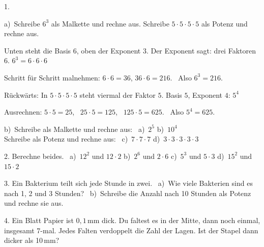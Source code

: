 \documentclass[11pt]{article}
\newcommand{\kennung}{VUD}
\newcommand{\grau}[1]{{\color{mbgrau}#1}}
\begin{document}
\pfheftstil
\fancyfoot[C]{\parbox[t]{\textwidth}{\mbfhbox\par\vspace{1.5mm}{\footnotesize\color{mbgrau}{\scriptsize \kennung}\hfill\thepage}}}
\begin{pfaufg}{}{1.}{}
\grau{a)\ Schreibe $6^3$ als Malkette und rechne aus. Schreibe $5 \cdot 5 \cdot 5 \cdot 5$ als Potenz und rechne aus.\par\smallskip Unten steht die Basis $6$, oben der Exponent $3$. Der Exponent sagt: drei Faktoren $6$. \quad $6^3 = 6 \cdot 6 \cdot 6$\par Schritt für Schritt malnehmen: \quad $6 \cdot 6 = 36$, \quad $36 \cdot 6 = 216$. \ Also $6^3 = 216$.\par Rückwärts: In $5 \cdot 5 \cdot 5 \cdot 5$ steht viermal der Faktor $5$. Basis $5$, Exponent $4$: \quad $5^4$\par Ausrechnen: \quad $5 \cdot 5 = 25$, \ $25 \cdot 5 = 125$, \ $125 \cdot 5 = 625$. \ Also $5^4 = 625$.}
\par\medskip
b)\ Schreibe als Malkette und rechne aus: \ a)~$2^5$ \qquad b)~$10^4$ \\ Schreibe als Potenz und rechne aus: \ c)~$7 \cdot 7 \cdot 7$ \qquad d)~$3 \cdot 3 \cdot 3 \cdot 3 \cdot 3$
\end{pfaufg}

\begin{pfaufg}{}{2.}{}
Berechne beides. \ a)~$12^2$ und $12 \cdot 2$ \qquad b)~$2^6$ und $2 \cdot 6$ \qquad c)~$5^3$ und $5 \cdot 3$ \qquad d)~$15^2$ und $15 \cdot 2$
\end{pfaufg}

\begin{pfaufg}{}{3.}{}
Ein Bakterium teilt sich jede Stunde in zwei. \ a)~Wie viele Bakterien sind es nach 1, 2 und 3 Stunden? \ b)~Schreibe die Anzahl nach 10 Stunden als Potenz und rechne sie aus.
\end{pfaufg}

\begin{pfaufg}{}{4.}{}
Ein Blatt Papier ist $0{,}1$\,mm dick. Du faltest es in der Mitte, dann noch einmal, insgesamt 7-mal. Jedes Falten verdoppelt die Zahl der Lagen. Ist der Stapel dann dicker als 10\,mm?
\end{pfaufg}
\end{document}
